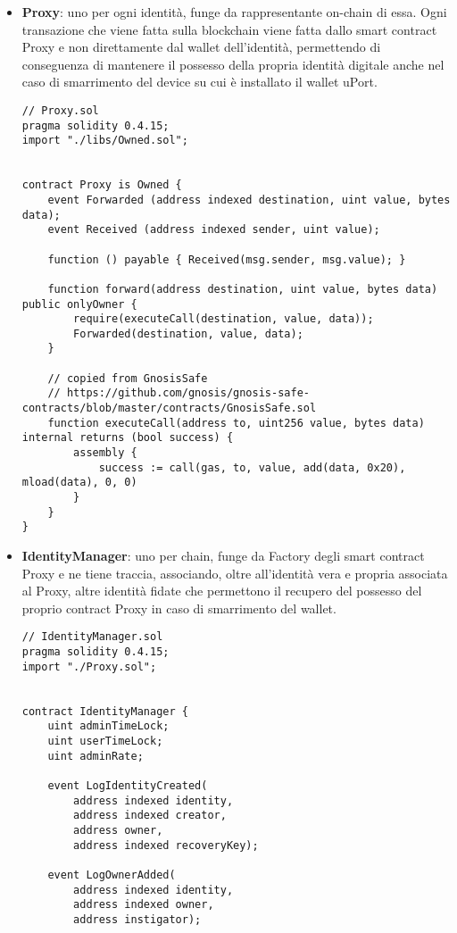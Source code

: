 \begin{itemize}
  \item \textbf{Proxy}: uno per ogni identità, funge da rappresentante on-chain di essa. Ogni transazione che viene fatta
  sulla blockchain viene fatta dallo smart contract Proxy e non direttamente dal wallet dell’identità, permettendo
  di conseguenza di mantenere il possesso della propria identità digitale anche nel caso di smarrimento del 
  device su cui è installato il wallet uPort.

  \begin{lstlisting}[language=Solidity]
// Proxy.sol
pragma solidity 0.4.15;
import "./libs/Owned.sol";


contract Proxy is Owned {
    event Forwarded (address indexed destination, uint value, bytes data);
    event Received (address indexed sender, uint value);

    function () payable { Received(msg.sender, msg.value); }

    function forward(address destination, uint value, bytes data) public onlyOwner {
        require(executeCall(destination, value, data));
        Forwarded(destination, value, data);
    }

    // copied from GnosisSafe
    // https://github.com/gnosis/gnosis-safe-contracts/blob/master/contracts/GnosisSafe.sol
    function executeCall(address to, uint256 value, bytes data) internal returns (bool success) {
        assembly {
            success := call(gas, to, value, add(data, 0x20), mload(data), 0, 0)
        }
    }
}
  \end{lstlisting}
  \item \textbf{IdentityManager}: uno per chain, funge da Factory degli smart contract Proxy e ne tiene traccia,
  associando, oltre all’identità vera e propria associata al Proxy, altre identità fidate che permettono
  il recupero del possesso del proprio contract Proxy in caso di smarrimento del wallet.

  \begin{lstlisting}[language=Solidity]
// IdentityManager.sol
pragma solidity 0.4.15;
import "./Proxy.sol";


contract IdentityManager {
    uint adminTimeLock;
    uint userTimeLock;
    uint adminRate;

    event LogIdentityCreated(
        address indexed identity,
        address indexed creator,
        address owner,
        address indexed recoveryKey);

    event LogOwnerAdded(
        address indexed identity,
        address indexed owner,
        address instigator);


\end{lstlisting}
\end{itemize}

